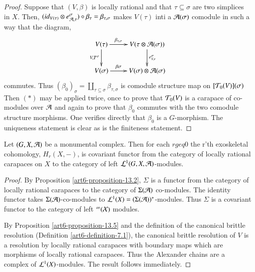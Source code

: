 \begin{proof}
Suppose that $(V, \beta)$ is locally rational and that $\tau \subseteq \sigma$ are two simplices in $X$. Then, $(id_{V(\tau)}\otimes e_{\mathcal{A}, \tau}^{\sigma})\circ \beta_{\tau}= \beta_{\tau, \sigma}$ makes $V(\tau)$ inti a $\mathcal{A}(\sigma)$ comodule in such a way that  the diagram,
\begin{equation*}
\vcenter{
\xymatrix{
V(\tau)\ar[d]_-{V, T^{\sigma}}\ar[r]^-{\beta_{\tau, \sigma}} & V(\tau \otimes \calA(\sigma))\ar[d]^-{e_{V, \tau}^{\sigma}}\\
V(\sigma)\ar[r]^-{\beta \sigma}& V(\sigma)\otimes \calA(\sigma)
}}
\end{equation*}
commutes. Thus $(\beta_{0})_{\sigma} = \coprod_{\tau \subseteq \sigma} \beta_{\tau, \sigma}$ is comodule structure map on $[\mathcal{T}_{0}(V)](\sigma)$ Then $(*)$ may be applied twice, once to prove that $\mathcal{T}_{0}(V)$ is a carapace of co-modules over $\mathcal{A}$ and again to prove that $\beta_{0}$ commutes with the two comodule structure morphisms. One verifies directly that $\beta_{0}$ is a $G$-morphism. The uniqueness statement is clear as is the finiteness statement.
\end{proof}

\begin{prop}\label{art6-proposition-13.6}
Let $(G, X, \mathcal{A})$ be a monumental complex. Then for each $r geq 0$ the r'th exoskeletal cohomology, $H_{r}(X, -)$, is covariant functor from the category of locally rational carapaces on $X$ to the category of left $\mathcal{L}^{1}(G, X, \mathcal{A})$-modules. 
\end{prop}

\begin{proof}
By Proposition \ref{art6-proposition-13.2}, $\Sigma$ is a functor from the category of locally rational carapaces to the category of $\Sigma(\mathcal{A})$ co-modules. The identity functor takes $\Sigma(\mathcal{A})$-co-modules to
$\mathcal{L}^{1}(X)= (\Sigma(\mathcal{A}))^{*}$-modules. Thus $\Sigma$ is a covariant functor to the category of left $\cal^{1}(X)$ modules.

By Proposition \ref{art6-proposition-13.5} and the definition of the canonical brittle resolution (Definition \ref{art6-definition-7.1}), the canonical brittle resolution of $V$ is a resolution by locally rational carapaces with boundary maps which are morphisms of locally rational carapaces. Thus the Alexander chains are a complex of $\mathcal{L}^{1}(X)$-modules. The result follows immediately. 
\end{proof}

